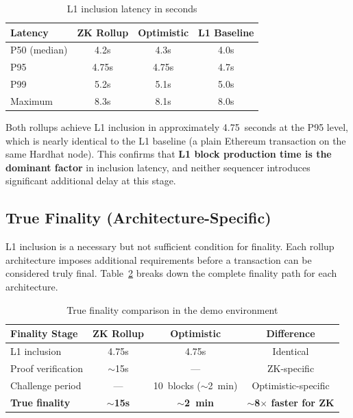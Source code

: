 \begin{table}[h]
    \centering
    \begin{tabular}{l|c|c|c}
        \hline
        \textbf{Latency} & \textbf{ZK Rollup} & \textbf{Optimistic} & \textbf{L1 Baseline} \\
        \hline
        P50 (median) & 4.2s & 4.3s & 4.0s \\
        \hline
        P95 & 4.75s & 4.75s & 4.7s \\
        \hline
        P99 & 5.2s & 5.1s & 5.0s \\
        \hline
        Maximum & 8.3s & 8.1s & 8.0s \\
        \hline
    \end{tabular}
    \caption{L1 inclusion latency in seconds}
    \label{tab:l1-latency}
\end{table}

Both rollups achieve L1 inclusion in approximately 4.75~seconds at the P95 level, which is nearly identical to the L1 baseline (a plain Ethereum transaction on the same Hardhat node). This confirms that \textbf{L1 block production time is the dominant factor} in inclusion latency, and neither sequencer introduces significant additional delay at this stage.

\subsection{True Finality (Architecture-Specific)}

L1 inclusion is a necessary but not sufficient condition for finality. Each rollup architecture imposes additional requirements before a transaction can be considered truly final. Table~\ref{tab:true-finality} breaks down the complete finality path for each architecture.

\begin{table}[h]
    \centering
    \begin{tabular}{l|c|c|c}
        \hline
        \textbf{Finality Stage} & \textbf{ZK Rollup} & \textbf{Optimistic} & \textbf{Difference} \\
        \hline
        L1 inclusion & 4.75s & 4.75s & Identical \\
        \hline
        Proof verification & $\sim$15s & --- & ZK-specific \\
        \hline
        Challenge period & --- & 10~blocks ($\sim$2~min) & Optimistic-specific \\
        \hline
        \textbf{True finality} & \textbf{$\sim$15s} & \textbf{$\sim$2~min} & \textbf{$\sim$8$\times$ faster for ZK} \\
        \hline
    \end{tabular}
    \caption{True finality comparison in the demo environment}
    \label{tab:true-finality}
\end{table}

